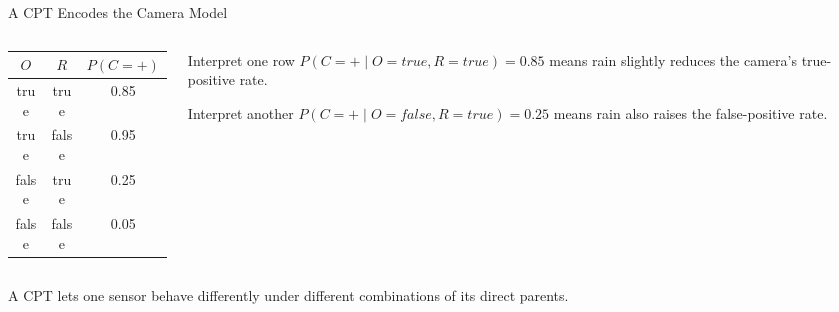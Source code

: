 \documentclass[aspectratio=169,10pt]{beamer}
\begin{document}
\begin{frame}[shrink=10]{A CPT Encodes the Camera Model}
  \begin{columns}[T,onlytextwidth]
    \begin{column}{0.53\textwidth}
      \begin{center}
      \renewcommand{\arraystretch}{1.25}
      \begin{tabular}{c|c|c}
        \textbf{$O$} & \textbf{$R$} & \textbf{$P(C=+)$} \\\hline
        true & true & 0.85 \\
        true & false & 0.95 \\
        false & true & 0.25 \\
        false & false & 0.05
      \end{tabular}
      \end{center}
    \end{column}
    \begin{column}{0.41\textwidth}
      \begin{block}{Interpret one row}
        $P(C=+\mid O=true,R=true)=0.85$ means rain slightly reduces the camera's true-positive rate.
      \end{block}

      \begin{block}{Interpret another}
        $P(C=+\mid O=false,R=true)=0.25$ means rain also raises the false-positive rate.
      \end{block}
    \end{column}
  \end{columns}

  \begin{keyidea}
    A CPT lets one sensor behave differently under different combinations of its direct parents.
  \end{keyidea}
\end{frame}
\end{document}
